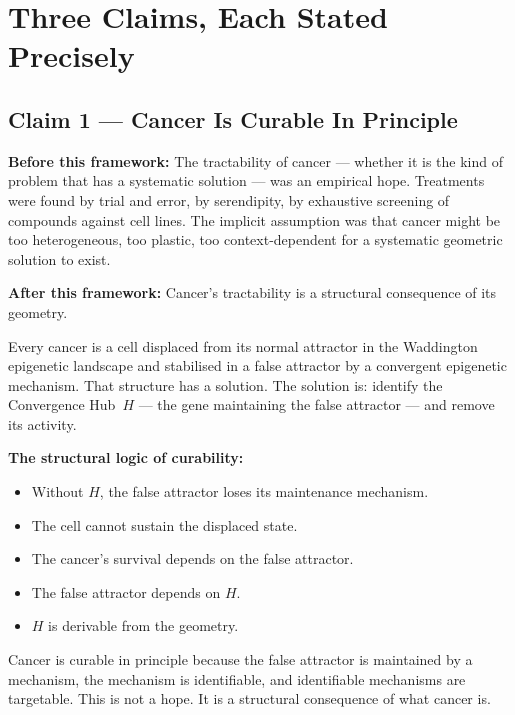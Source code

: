 \documentclass[11pt, a4paper]{article}
\begin{document}
\section{Three Claims, Each Stated Precisely}

\subsection{Claim 1 --- Cancer Is Curable In Principle}

\textbf{Before this framework:} The tractability of
cancer --- whether it is the kind of problem that has a
systematic solution --- was an empirical hope. Treatments
were found by trial and error, by serendipity, by exhaustive
screening of compounds against cell lines. The implicit
assumption was that cancer might be too heterogeneous, too
plastic, too context-dependent for a systematic geometric
solution to exist.

\textbf{After this framework:} Cancer's tractability is a
structural consequence of its geometry.

Every cancer is a cell displaced from its normal attractor
in the Waddington epigenetic landscape and stabilised in a
false attractor by a convergent epigenetic mechanism. That
structure has a solution. The solution is: identify the
Convergence Hub~$H$ --- the gene maintaining the false
attractor --- and remove its activity.

\begin{mdframed}[backgroundcolor=methodbox,
                 linecolor=green!40!black,
                 linewidth=1pt]
\textbf{The structural logic of curability:}
\begin{itemize}[noitemsep]
    \item Without $H$, the false attractor loses its
    maintenance mechanism.
    \item The cell cannot sustain the displaced state.
    \item The cancer's survival depends on the false
    attractor.
    \item The false attractor depends on $H$.
    \item $H$ is derivable from the geometry.
\end{itemize}
Cancer is curable in principle because the false attractor
is maintained by a mechanism, the mechanism is identifiable,
and identifiable mechanisms are targetable. This is not a
hope. It is a structural consequence of what cancer is.
\end{mdframed}
\end{document}
